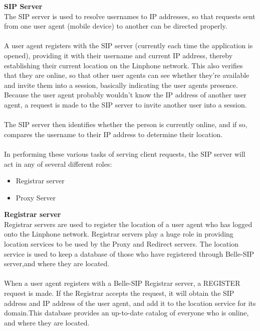 \documentclass[a4paper]{article}
\begin{document}
\textbf{SIP Server\\}
The SIP server is used to resolve usernames to IP addresses, so that requests sent from one user agent (mobile device)  to another can be directed properly. \\
\\
A user agent registers with the SIP server (currently each time the application is opened), providing it with their username and current IP address, thereby establishing their current location on the Linphone network. This also veriﬁes that they are online, so that other user agents can see whether they’re available and invite them into a session, basically indicating the user agents presence. Because the user agent probably wouldn’t know the IP address of another user agent, a request is made to the SIP server to invite another user into a session.\\
\\
The SIP server then identiﬁes whether the person is currently online, and if so, compares the username to their IP address to determine their location. \\
\\
In performing these various tasks of serving client requests, the SIP server
will act in any of several different roles:
\begin{itemize}
\item Registrar server
\item Proxy Server
\end{itemize}

\textbf{Registrar server\\}
Registrar servers are used to register the location of a user agent who has logged onto the Linphone network. Registrar servers play a huge role in providing location services to be used by the Proxy and Redirect servers. The location service is used to keep a database of those who have registered through Belle-SIP server,and where they are located.\\ 
\\
When a user agent registers with a Belle-SIP Registrar server, a REGISTER request is made. If the Registrar accepts the request, it will obtain the SIP address and IP address of the user agent, and add it to the location service for its domain.This database provides an up-to-date catalog of everyone who is online, and where they are located.
\end{document}
